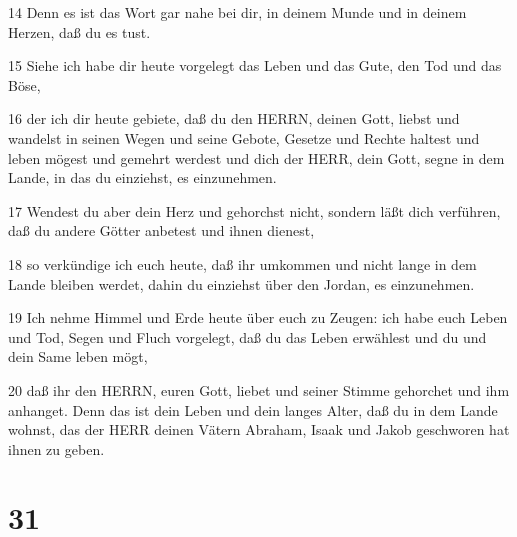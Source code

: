 \par 14 Denn es ist das Wort gar nahe bei dir, in deinem Munde und in deinem Herzen, daß du es tust.
\par 15 Siehe ich habe dir heute vorgelegt das Leben und das Gute, den Tod und das Böse,
\par 16 der ich dir heute gebiete, daß du den HERRN, deinen Gott, liebst und wandelst in seinen Wegen und seine Gebote, Gesetze und Rechte haltest und leben mögest und gemehrt werdest und dich der HERR, dein Gott, segne in dem Lande, in das du einziehst, es einzunehmen.
\par 17 Wendest du aber dein Herz und gehorchst nicht, sondern läßt dich verführen, daß du andere Götter anbetest und ihnen dienest,
\par 18 so verkündige ich euch heute, daß ihr umkommen und nicht lange in dem Lande bleiben werdet, dahin du einziehst über den Jordan, es einzunehmen.
\par 19 Ich nehme Himmel und Erde heute über euch zu Zeugen: ich habe euch Leben und Tod, Segen und Fluch vorgelegt, daß du das Leben erwählest und du und dein Same leben mögt,
\par 20 daß ihr den HERRN, euren Gott, liebet und seiner Stimme gehorchet und ihm anhanget. Denn das ist dein Leben und dein langes Alter, daß du in dem Lande wohnst, das der HERR deinen Vätern Abraham, Isaak und Jakob geschworen hat ihnen zu geben.

\chapter{31}

